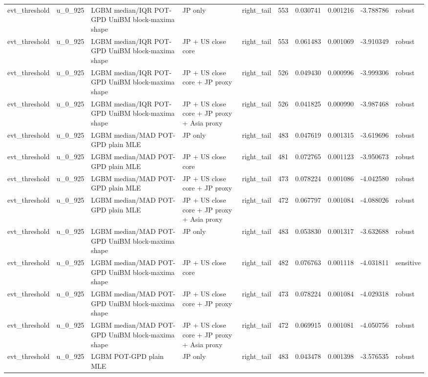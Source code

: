 \begin{tabular}{lll l lrrrrl}
evt\_threshold & u\_0\_925 & LGBM median/IQR POT-GPD UniBM block-maxima shape & JP only & right\_tail & 553 & 0.030741 & 0.001216 & -3.788786 & robust \\
evt\_threshold & u\_0\_925 & LGBM median/IQR POT-GPD UniBM block-maxima shape & JP + US close core & right\_tail & 553 & 0.061483 & 0.001069 & -3.910349 & robust \\
evt\_threshold & u\_0\_925 & LGBM median/IQR POT-GPD UniBM block-maxima shape & JP + US close core + JP proxy & right\_tail & 526 & 0.049430 & 0.000996 & -3.999306 & robust \\
evt\_threshold & u\_0\_925 & LGBM median/IQR POT-GPD UniBM block-maxima shape & JP + US close core + JP proxy + Asia proxy & right\_tail & 526 & 0.041825 & 0.000990 & -3.987468 & robust \\
evt\_threshold & u\_0\_925 & LGBM median/MAD POT-GPD plain MLE & JP only & right\_tail & 483 & 0.047619 & 0.001315 & -3.619696 & robust \\
evt\_threshold & u\_0\_925 & LGBM median/MAD POT-GPD plain MLE & JP + US close core & right\_tail & 481 & 0.072765 & 0.001123 & -3.950673 & robust \\
evt\_threshold & u\_0\_925 & LGBM median/MAD POT-GPD plain MLE & JP + US close core + JP proxy & right\_tail & 473 & 0.078224 & 0.001086 & -4.042580 & robust \\
evt\_threshold & u\_0\_925 & LGBM median/MAD POT-GPD plain MLE & JP + US close core + JP proxy + Asia proxy & right\_tail & 472 & 0.067797 & 0.001084 & -4.088026 & robust \\
evt\_threshold & u\_0\_925 & LGBM median/MAD POT-GPD UniBM block-maxima shape & JP only & right\_tail & 483 & 0.053830 & 0.001317 & -3.632688 & robust \\
evt\_threshold & u\_0\_925 & LGBM median/MAD POT-GPD UniBM block-maxima shape & JP + US close core & right\_tail & 482 & 0.076763 & 0.001118 & -4.031811 & sensitive \\
evt\_threshold & u\_0\_925 & LGBM median/MAD POT-GPD UniBM block-maxima shape & JP + US close core + JP proxy & right\_tail & 473 & 0.078224 & 0.001084 & -4.029318 & robust \\
evt\_threshold & u\_0\_925 & LGBM median/MAD POT-GPD UniBM block-maxima shape & JP + US close core + JP proxy + Asia proxy & right\_tail & 472 & 0.069915 & 0.001081 & -4.050756 & robust \\
evt\_threshold & u\_0\_925 & LGBM POT-GPD plain MLE & JP only & right\_tail & 483 & 0.043478 & 0.001398 & -3.576535 & robust \\

\end{tabular}
